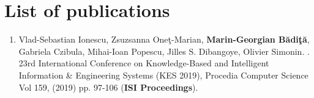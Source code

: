 \chapter*{List of publications}

\begin{normalsize}

\begin{enumerate}

\item [\cite{kes}] Vlad-Sebastian Ionescu, Zsuzsanna One\c t-Marian, \textbf{Marin-Georgian B\u adi\c t\u a}, Gabriela Czibula, Mihai-Ioan Popescu, Jilles S. Dibangoye, Olivier Simonin.
.
\newblock 23rd International Conference on Knowledge-Based and Intelligent Information \& Engineering Systems (KES 2019), Procedia Computer Science  Vol 159, (2019)  pp. 97-106 (\textbf{ISI Proceedings}). 

\end{enumerate}

\end{normalsize}
